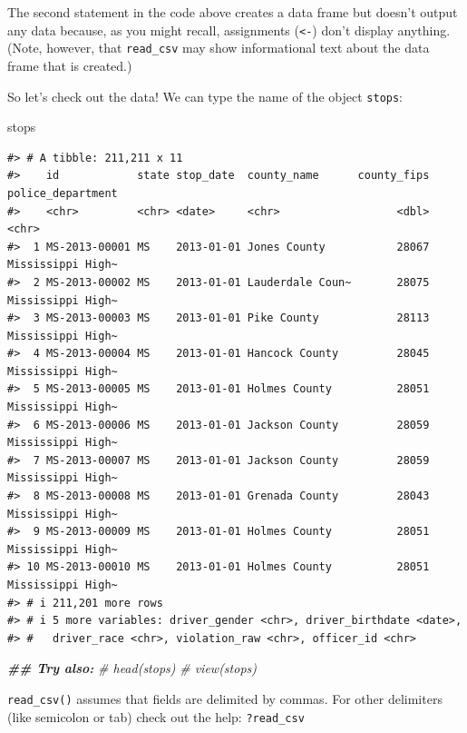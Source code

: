 \documentclass[
]{book}
\newenvironment{Shaded}{\begin{snugshade}}{\end{snugshade}}
\newcommand{\CommentTok}[1]{\textcolor[rgb]{0.56,0.35,0.01}{\textit{#1}}}
\newcommand{\DocumentationTok}[1]{\textcolor[rgb]{0.56,0.35,0.01}{\textbf{\textit{#1}}}}
\newcommand{\NormalTok}[1]{#1}
\begin{document}
The second statement in the code above creates a data frame but doesn't output any data because, as you might recall, assignments (\texttt{\textless{}-}) don't display anything. (Note, however, that \texttt{read\_csv} may show informational text about the data frame that is created.)

So let's check out the data! We can type the name of the object \texttt{stops}:

\begin{Shaded}
\begin{Highlighting}[]
\NormalTok{stops}
\end{Highlighting}
\end{Shaded}

\begin{verbatim}
#> # A tibble: 211,211 x 11
#>    id            state stop_date  county_name      county_fips police_department
#>    <chr>         <chr> <date>     <chr>                  <dbl> <chr>            
#>  1 MS-2013-00001 MS    2013-01-01 Jones County           28067 Mississippi High~
#>  2 MS-2013-00002 MS    2013-01-01 Lauderdale Coun~       28075 Mississippi High~
#>  3 MS-2013-00003 MS    2013-01-01 Pike County            28113 Mississippi High~
#>  4 MS-2013-00004 MS    2013-01-01 Hancock County         28045 Mississippi High~
#>  5 MS-2013-00005 MS    2013-01-01 Holmes County          28051 Mississippi High~
#>  6 MS-2013-00006 MS    2013-01-01 Jackson County         28059 Mississippi High~
#>  7 MS-2013-00007 MS    2013-01-01 Jackson County         28059 Mississippi High~
#>  8 MS-2013-00008 MS    2013-01-01 Grenada County         28043 Mississippi High~
#>  9 MS-2013-00009 MS    2013-01-01 Holmes County          28051 Mississippi High~
#> 10 MS-2013-00010 MS    2013-01-01 Holmes County          28051 Mississippi High~
#> # i 211,201 more rows
#> # i 5 more variables: driver_gender <chr>, driver_birthdate <date>,
#> #   driver_race <chr>, violation_raw <chr>, officer_id <chr>
\end{verbatim}

\begin{Shaded}
\begin{Highlighting}[]
\DocumentationTok{\#\# Try also:}
\CommentTok{\# head(stops)}
\CommentTok{\# view(stops)}
\end{Highlighting}
\end{Shaded}

\texttt{read\_csv()} assumes that fields are delimited by commas. For other delimiters (like semicolon or tab) check out the help: \texttt{?read\_csv}
\end{document}
